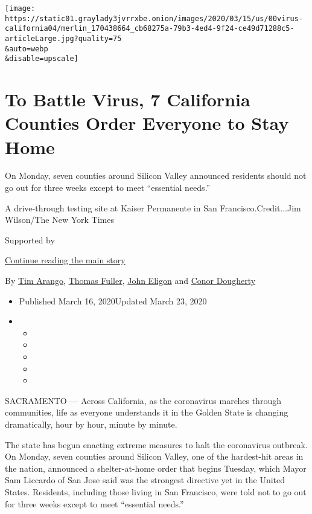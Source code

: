 \texttt{[image: https://static01.graylady3jvrrxbe.onion/images/2020/03/15/us/00virus-california04/merlin\_170438664\_cb68275a-79b3-4ed4-9f24-ce49d71288c5-articleLarge.jpg?quality=75\\\&auto=webp\\\&disable=upscale]}

\hypertarget{to-battle-virus-7-california-counties-order-everyone-to-stay-home}{%
\section{To Battle Virus, 7 California Counties Order Everyone to Stay
Home}\label{to-battle-virus-7-california-counties-order-everyone-to-stay-home}}

On Monday, seven counties around Silicon Valley announced residents
should not go out for three weeks except to meet ``essential needs.''

A drive-through testing site at Kaiser Permanente in San
Francisco.Credit...Jim Wilson/The New York Times

Supported by

\protect\hyperlink{after-sponsor}{Continue reading the main story}

By \href{https://www.nytimes3xbfgragh.onion/by/tim-arango}{Tim Arango},
\href{https://www.nytimes3xbfgragh.onion/by/thomas-fuller}{Thomas
Fuller}, \href{https://www.nytimes3xbfgragh.onion/by/john-eligon}{John
Eligon} and
\href{https://www.nytimes3xbfgragh.onion/by/conor-dougherty}{Conor
Dougherty}

\begin{itemize}
\item
  Published March 16, 2020Updated March 23, 2020
\item
  \begin{itemize}
  \item
  \item
  \item
  \item
  \item
  \end{itemize}
\end{itemize}

SACRAMENTO --- Across California, as the coronavirus marches through
communities, life as everyone understands it in the Golden State is
changing dramatically, hour by hour, minute by minute.

The state has begun enacting extreme measures to halt the coronavirus
outbreak. On Monday, seven counties around Silicon Valley, one of the
hardest-hit areas in the nation, announced a shelter-at-home order that
begins Tuesday, which Mayor Sam Liccardo of San Jose said was the
strongest directive yet in the United States. Residents, including those
living in San Francisco, were told not to go out for three weeks except
to meet ``essential needs.''

